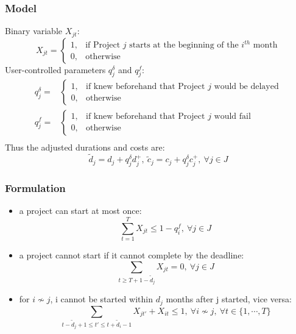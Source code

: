 \documentclass{beamer}
\begin{document}
		\begin{frame}
			\frametitle{Model}
			Binary variable $X_{jt}$:
			\begin{equation*}
				X_{jt}=
				\begin{cases}
					1, & \text{if Project } j \text{ starts at the beginning of the } i^{th} \text{ month} \\
					0, & \text{otherwise}
				\end{cases}
			\end{equation*}
			User-controlled parameters $q^{\delta}_j$ and $q^f_j$:
			\begin{equation*}
				\begin{array}{cl}
					q^{\delta}_j= &
					\begin{cases}
						1, & \text{if knew beforehand that Project } j \text{ would be delayed} \\
						0, & \text{otherwise}
					\end{cases}\\
					q^{f}_j= &
					\begin{cases}
						1, & \text{if knew beforehand that Project } j \text{ would fail} \\
						0, & \text{otherwise}
					\end{cases}\\
				\end{array}
			\end{equation*}
			Thus the adjusted durations and costs are:
			\begin{equation*}
				\tilde{d}_j=d_j+q^{\delta}_j d^+_j
				,~
				\tilde{c}_j=c_j+q^{\delta}_j c^+_j
				,~\forall j \in J
			\end{equation*}
		\end{frame}
		
		\begin{frame}
			\frametitle{Formulation}
			\begin{itemize}
				\item a project can start at most once:
					\begin{equation*}
						\sum\limits_{t=1}^{T} X_{jt} \leq 1-q^f_i,~\forall j \in J
					\end{equation*}
				\item a project cannot start if it cannot complete by the deadline:
					\begin{equation*}
						\sum\limits_{t\geq T+1-\tilde{d}_j} X_{jt}=0,~\forall j \in J
					\end{equation*}
				\item for $i \nsim j$, i cannot be started within $d_j$ months after j started, vice versa:
					\begin{equation*}
						\sum\limits_{t-\tilde{d}_j+1\leq t'\leq t+\tilde{d}_i-1} X_{jt'} + X_{it} \leq 1,~\forall i \nsim j,~\forall t \in \{1,\cdots,T\}
					\end{equation*}
			\end{itemize}
		\end{frame}
		
\end{document}
